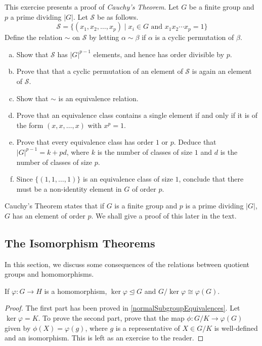 \begin{exercise}
    This exercise presents a proof of \textit{Cauchy's Theorem}. Let $G$ be a finite group and $p$ a prime dividing $|G|$. Let $\mathcal{S}$ be as follows.
    $$\mathcal{S}=\{(x_1,x_2,\ldots,x_p)\mid x_i\in G\text{ and } x_1x_2\cdots x_p=1\}$$
    Define the relation $\sim$ on $\mathcal{S}$ by letting $\alpha\sim\beta$ if $\alpha$ is a cyclic permutation of $\beta$.
    \begin{enumerate}[(a)]
        \item Show that $\mathcal{S}$ has $|G|^{p-1}$ elements, and hence has order divisible by $p$.
        \item Prove that that a cyclic permutation of an element of $\mathcal{S}$ is again an element of $\mathcal{S}$.
        \item Show that $\sim$ is an equivalence relation.
        \item Prove that an equivalence class contains a single element if and only if it is of the form $(x,x,\ldots,x)$ with $x^p=1$.
        \item Prove that every equivalence class has order $1$ or $p$. Deduce that $|G|^{p-1}=k+pd$, where $k$ is the number of classes of size $1$ and $d$ is the number of classes of size $p$.
        \item Since $\{(1,1,\ldots,1)\}$ is an equivalence class of size $1$, conclude that there must be a non-identity element in $G$ of order $p$.
    \end{enumerate}
    
    Cauchy's Theorem states that if $G$ is a finite group and $p$ is a prime dividing $|G|$, $G$ has an element of order $p$. We shall give a proof of this later in the text.
\end{exercise}

\subsection{The Isomorphism Theorems}

In this section, we discuss some consequences of the relations between quotient groups and homomorphisms.

\begin{theorem}
\label{FirstIsoTheorem}
    If $\varphi:G\to H$ is a homomorphism, $\ker\varphi\unlhd G$ and $G/\ker\varphi\cong\varphi(G)$.
\end{theorem}
\begin{proof}
    The first part has been proved in \ref{normalSubgroupEquivalences}. Let $\ker\varphi=K$. To prove the second part, prove that the map $\phi:G/K\to\varphi(G)$ given by $\phi(X)=\varphi(g)$, where $g$ is a representative of $X\in G/K$ is well-defined and an isomorphism. This is left as an exercise to the reader.
\end{proof}

